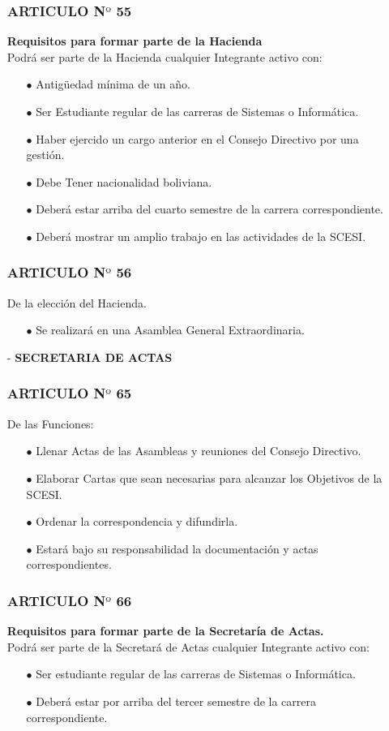 \documentclass[letterpaper,11pt]{book}
\begin{document}
\begin{itemize}
\subsubsection*{ARTICULO N$º$ 55}
{\bf Requisitos para formar parte de la Hacienda}\\
Podrá ser parte de la Hacienda cualquier Integrante activo con:
\begin{itemize}
\item[$\bullet$] Antigüedad mínima de un año.
\item[$\bullet$] Ser Estudiante regular de las carreras de Sistemas o Informática.  
\item[$\bullet$] Haber ejercido un cargo anterior en el Consejo Directivo por una gestión. 
\item[$\bullet$] Debe Tener nacionalidad boliviana. 
\item[$\bullet$] Deberá estar arriba del cuarto semestre de la carrera  correspondiente. 
\item[$\bullet$] Deberá mostrar un amplio trabajo en las actividades de la SCESI. 
\end{itemize}
\subsubsection*{ARTICULO N$º$ 56}
De la elección del Hacienda.
\begin{itemize}
\item[$\bullet$] Se realizará en una Asamblea General Extraordinaria.
\end{itemize}
\item[-] {\bf SECRETARIA DE ACTAS}
\subsubsection*{ARTICULO N$º$ 65}
De las Funciones:
\begin{itemize}
\item[$\bullet$] Llenar Actas de las Asambleas y reuniones del Consejo Directivo. 
\item[$\bullet$] Elaborar Cartas que sean necesarias para alcanzar los Objetivos de la SCESI. 
\item[$\bullet$] Ordenar la correspondencia y difundirla. 
\item[$\bullet$] Estará bajo su responsabilidad la documentación y actas correspondientes. 
\end{itemize}
\subsubsection*{ARTICULO N$º$ 66}
{\bf Requisitos para formar parte de la Secretaría de Actas.}\\
Podrá ser parte de la Secretará de Actas cualquier Integrante activo con:
\begin{itemize}
\item[$\bullet$] Ser estudiante regular de las carreras de Sistemas o Informática. 
\item[$\bullet$] Deberá estar por arriba del tercer semestre de la carrera correspondiente. 
\end{itemize}

\end{itemize}
\end{document}
